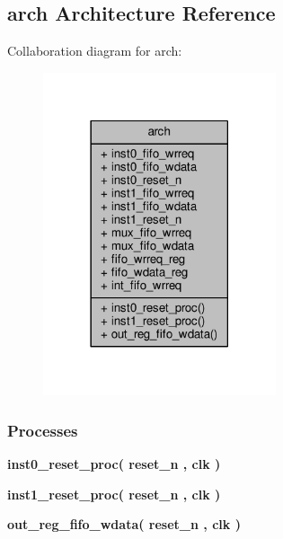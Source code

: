 \subsection{arch Architecture Reference}
\label{classrxiq__mimo_1_1arch}


Collaboration diagram for arch\+:\nopagebreak
\begin{figure}[H]
\begin{center}
\leavevmode
\includegraphics[width=194pt]{dc/d82/classrxiq__mimo_1_1arch__coll__graph}
\end{center}
\end{figure}
\subsubsection*{Processes}
 \begin{DoxyCompactItemize}
\item 
{\bf inst0\+\_\+reset\+\_\+proc}{\bfseries  ( {\bfseries {\bfseries {\bf reset\+\_\+n}} \textcolor{vhdlchar}{ }} , {\bfseries {\bfseries {\bf clk}} \textcolor{vhdlchar}{ }} )}
\item 
{\bf inst1\+\_\+reset\+\_\+proc}{\bfseries  ( {\bfseries {\bfseries {\bf reset\+\_\+n}} \textcolor{vhdlchar}{ }} , {\bfseries {\bfseries {\bf clk}} \textcolor{vhdlchar}{ }} )}
\item 
{\bf out\+\_\+reg\+\_\+fifo\+\_\+wdata}{\bfseries  ( {\bfseries {\bfseries {\bf reset\+\_\+n}} \textcolor{vhdlchar}{ }} , {\bfseries {\bfseries {\bf clk}} \textcolor{vhdlchar}{ }} )}
\end{DoxyCompactItemize}
